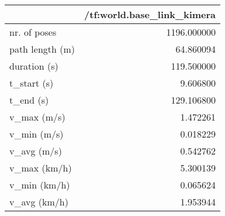\begin{tabular}{lr}
\toprule
{} &  /tf:world.base\_link\_kimera \\
\midrule
nr. of poses    &                 1196.000000 \\
path length (m) &                   64.860094 \\
duration (s)    &                  119.500000 \\
t\_start (s)     &                    9.606800 \\
t\_end (s)       &                  129.106800 \\
v\_max (m/s)     &                    1.472261 \\
v\_min (m/s)     &                    0.018229 \\
v\_avg (m/s)     &                    0.542762 \\
v\_max (km/h)    &                    5.300139 \\
v\_min (km/h)    &                    0.065624 \\
v\_avg (km/h)    &                    1.953944 \\
\bottomrule
\end{tabular}
